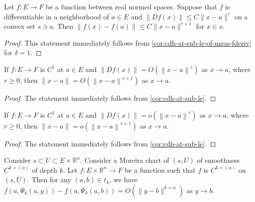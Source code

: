 \begin{corollary}%
  \label{cor:cdh-at-sub-le}
  Let \(f\colon E\to F\) be a function between real normed spaces.
  Suppose that \(f\) is differentiable in a neighborhood of \(a \in E\)
  and \(\|Df(x)\|\le C\|x - a\|^{r}\) on a convex set \(s \ni a\).
  Then \(\|f(x) - f(a)\|\le C\|x - a\|^{r + 1}\) for \(x\in s\).
\end{corollary}

\begin{proof}
  This statement immediately follows from \autoref{cor:cdh-at-sub-le-of-meas-fderiv} for \(\delta = 1\).
\end{proof}

\begin{corollary}%
  \label{cor:sub-isBigO-rpow-of-fderiv}
  If \(f\colon E \to F\) is \(C^{1}\) at \(a \in E\) and \(\|Df(x)\|=O\left(\left\|x - a\right\|^{r}\right)\) as \(x\to a\), where \(r\ge 0\),
  then \(\|x - a\| = O\left(\left\|x - a\right\|^{r + 1}\right)\) as \(x\to a\).
\end{corollary}

\begin{proof}
  The statement immediately follows from \autoref{cor:cdh-at-sub-le}.
\end{proof}

\begin{corollary}%
  \label{cor:sub-isLittleO-rpow-of-fderiv}
  If \(f\colon E \to F\) is \(C^{1}\) at \(a \in E\) and \(\|Df(x)\|=o\left(\left\|x - a\right\|^{r}\right)\) as \(x\to a\), where \(r\ge 0\),
  then \(\|x - a\| = o\left(\left\|x - a\right\|^{r + 1}\right)\) as \(x\to a\).
\end{corollary}

\begin{proof}
  The statement immediately follows from \autoref{cor:cdh-at-sub-le}.
\end{proof}

\begin{theorem}%
  \label{thm:moreira-chart-isBigO}
  Consider \(s\subset U\subset E\times\mathbb R^{n}\).
  Consider a Moreira chart of \((s, U)\) of smoothness \(C^{k+(\alpha)}\) of depth \(k\).
  Let \(f\colon E\times\mathbb R^{n}\to F\) be a function
  such that \(f\) is \(C^{k+(\alpha)}\) on \((s, U)\).
  Then for any \((a, b)\in t_{k}\), we have
  \(f(a, \Psi_{k}(a, y)) - f(a, \Psi_{k}(a, b))=O\left(\|y - b\|^{k + \alpha}\right)\) as \(y\to b\).
\end{theorem}

